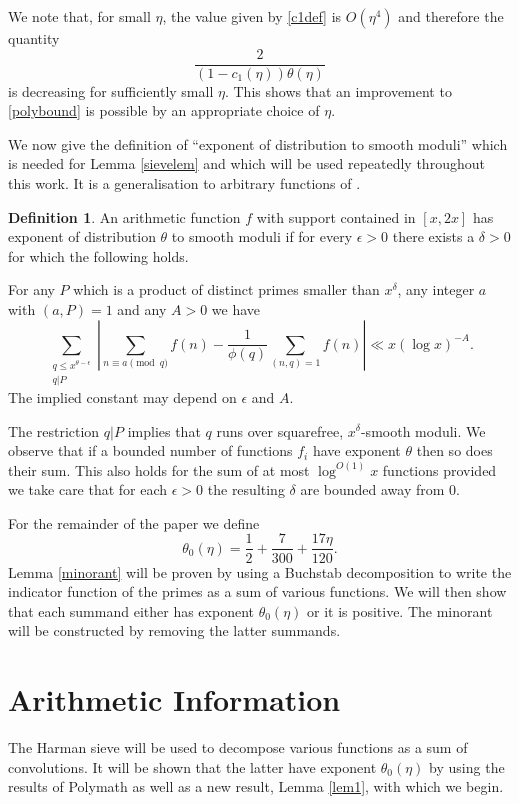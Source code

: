 \documentclass[12pt]{amsart}
\theoremstyle{plain}
\theoremstyle{definition}
\newtheorem{dfn}{Definition}
\numberwithin{equation}{section}
\newcommand{\twosum}[2]{\sum_{\substack{#1\\#2}}}
\begin{document}
We note that, for small $\eta$, the value given by \eqref{c1def} is $O(\eta^4)$ and therefore the quantity 
$$\frac{2}{(1-c_1(\eta))\theta(\eta)}$$
is decreasing for sufficiently small $\eta$. This shows that an improvement to \eqref{polybound} is possible by an appropriate choice of $\eta$.  

We now give the definition of ``exponent of distribution to smooth moduli'' which is needed for Lemma \ref{sievelem} and which will be used repeatedly throughout this work.  It is a generalisation to arbitrary functions of \cite[Claim 2.3]{polymath8a}.

\begin{dfn}\label{smoothlevel}
An arithmetic function $f$ with support contained in $[x,2x]$ has exponent of distribution $\theta$ to smooth moduli if for every $\epsilon>0$ there exists a $\delta>0$ for which the following holds.  

For any $P$ which is a product of distinct primes smaller than $x^\delta$, any integer $a$ with $(a,P)=1$ and any $A>0$ we have 
$$\twosum{q\leq x^{\theta-\epsilon}}{q|P}\left|\sum_{n\equiv a\pmod q}f(n)-\frac{1}{\phi(q)}\sum_{(n,q)=1}f(n)\right|\ll x(\log x)^{-A}.$$
The implied constant may depend on $\epsilon$ and $A$.
\end{dfn}

The restriction $q|P$ implies that $q$ runs over squarefree, $x^\delta$-smooth moduli.  We observe that if a bounded number of functions $f_i$ have exponent $\theta$ then so does their sum.  This also holds for the sum of at most $\log^{O(1)}x$ functions provided we take care that for each $\epsilon>0$ the resulting $\delta$ are bounded away from $0$.  

For the remainder of the paper we define 
\begin{equation}\label{theta0def}
\theta_0(\eta)=\frac{1}{2}+\frac{7}{300}+\frac{17\eta}{120}.
\end{equation}
Lemma \ref{minorant} will be proven by using a Buchstab decomposition to write the indicator function of the primes as a sum of various functions.  We will then show that each summand either has exponent $\theta_0(\eta)$ or it is positive. The minorant will be constructed by removing the latter summands.


\section{Arithmetic Information}


The Harman sieve will be used to decompose various functions as a sum of convolutions.  It will be shown that the latter have exponent $\theta_0(\eta)$ by using the results of Polymath \cite[Theorem 2.8]{polymath8a} as well as a new result, Lemma \ref{lem1}, with which we begin. 
\end{document}
